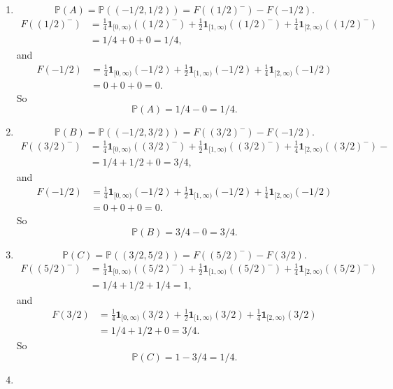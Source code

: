 \documentclass{article}
\newcommand{\bbp}{\mathbb{P}}
\begin{document}
\begin{enumerate}[(1)]
	\item 
		$$\bbp(A) = \bbp((-1/2,1/2)) = F((1/2)^-) - F(-1/2).$$
		\begin{align*}
		F((1/2)^-) &=  \frac{1}{4}\mathbf{1}_{[0, \infty)}((1/2)^-) + \frac{1}{2}\mathbf{1}_{[1,\infty)}((1/2)^-) + \frac{1}{4}\mathbf{1}_{[2,\infty)}((1/2)^-) \\
				 &	= 1/4+ 0+ 0  = 1/4,
		\end{align*}
		and
		\begin{align*}
        F(-1/2) &=  \frac{1}{4}\mathbf{1}_{[0, \infty)}(-1/2) + \frac{1}{2}\mathbf{1}_{[1,\infty)}(-1/2) + \frac{1}{4}\mathbf{1}_{[2,\infty)}(-1/2) \\
        			 &= 0 + 0 + 0 = 0.
        \end{align*}
        So
        $$\bbp(A) = 1/4 - 0 = 1/4.$$
	\item
		$$\bbp(B) = \bbp((-1/2,3/2)) = F((3/2)^-) - F(-1/2).$$
		\begin{align*}
		F((3/2)^-) &=  \frac{1}{4}\mathbf{1}_{[0, \infty)}((3/2)^-) + \frac{1}{2}\mathbf{1}_{[1,\infty)}((3/2)^-) + \frac{1}{4}\mathbf{1}_{[2,\infty)}((3/2)^-)- \\
			       &= 1/4+ 1/2+ 0  = 3/4,
		\end{align*}
		and
		\begin{align*}
        	F(-1/2) &=  \frac{1}{4}\mathbf{1}_{[0, \infty)}(-1/2) + \frac{1}{2}\mathbf{1}_{[1,\infty)}(-1/2) + \frac{1}{4}\mathbf{1}_{[2,\infty)}(-1/2) \\
        			&= 0 + 0 + 0 = 0.
        \end{align*}
        So
        $$\bbp(B) = 3/4 - 0 = 3/4.$$
	\item
		$$\bbp(C) = \bbp((3/2,5/2)) = F((5/2)^-) - F(3/2).$$
		\begin{align*}
			F((5/2)^-) &=  \frac{1}{4}\mathbf{1}_{[0, \infty)}((5/2)^-) + \frac{1}{2}\mathbf{1}_{[1,\infty)}((5/2)^-) + \frac{1}{4}\mathbf{1}_{[2,\infty)}((5/2)^-) \\
					   &= 1/4+ 1/2+ 1/4  = 1,
		\end{align*}
		and
		\begin{align*}
        	F(3/2) &=  \frac{1}{4}\mathbf{1}_{[0, \infty)}(3/2) + \frac{1}{2}\mathbf{1}_{[1,\infty)}(3/2) + \frac{1}{4}\mathbf{1}_{[2,\infty)}(3/2) \\
        		   &= 1/4 + 1/2 + 0 = 3/4.
        \end{align*}
        So
        $$\bbp(C) = 1 - 3/4 = 1/4.$$
	\item

\end{enumerate}
\end{document}
